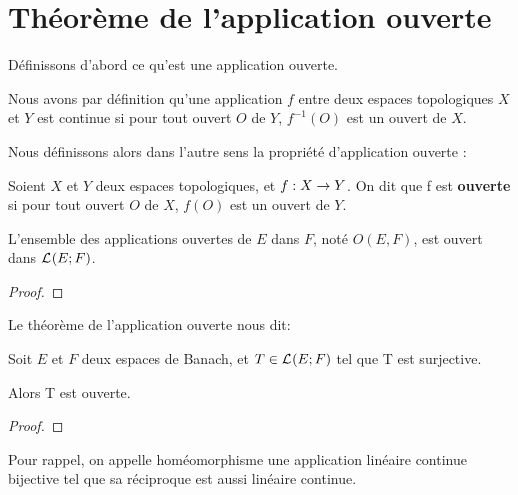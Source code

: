 \chapter{Théorème de l'application ouverte}

Définissons d'abord ce qu'est une application ouverte.

Nous avons par définition qu'une application $f$ entre deux espaces topologiques
$X$ et $Y$ est continue si pour tout ouvert $O$ de $Y$, $f^{-1}(O)$ est un
ouvert de $X$.

Nous définissons alors dans l'autre sens la propriété d'application ouverte :

\begin{definition}
	Soient $X$ et $Y$ deux espaces topologiques, et $f : X \rightarrow Y$. On
	dit que f est \textbf{ouverte} si pour tout ouvert $O$ de $X$, $f(O)$ est un
	ouvert de $Y$.
\end{definition}


%

\begin{proposition}
	L'ensemble des applications ouvertes de $E$ dans $F$, noté $O(E, F)$, est
	ouvert dans $\mathcal{L}_{}(E; F)$.
\end{proposition}

\ifdefined\outputproof
\begin{proof}

\end{proof}
\fi

Le théorème de l'application ouverte nous dit:

\begin{theorem} 
\label{theorem_open_application}
	Soit $E$ et $F$ deux espaces de Banach, et $T \in \mathcal{L}_{}(E; F)$ tel
	que T est surjective.

	Alors T est ouverte.
\end{theorem}

\ifdefined\outputproof
\begin{proof}

\end{proof}
\fi

Pour rappel, on appelle homéomorphisme une application linéaire continue bijective
tel que sa réciproque est aussi linéaire continue.

